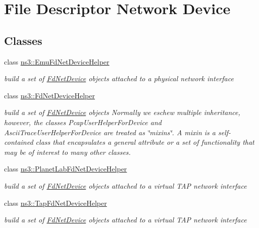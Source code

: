 \hypertarget{group__fd-net-device}{}\section{File Descriptor Network Device}
\label{group__fd-net-device}
\subsection*{Classes}
\begin{DoxyCompactItemize}
\item 
class \hyperlink{classns3_1_1EmuFdNetDeviceHelper}{ns3\+::\+Emu\+Fd\+Net\+Device\+Helper}
\begin{DoxyCompactList}\small\item\em build a set of \hyperlink{classns3_1_1FdNetDevice}{Fd\+Net\+Device} objects attached to a physical network interface \end{DoxyCompactList}\item 
class \hyperlink{classns3_1_1FdNetDeviceHelper}{ns3\+::\+Fd\+Net\+Device\+Helper}
\begin{DoxyCompactList}\small\item\em build a set of \hyperlink{classns3_1_1FdNetDevice}{Fd\+Net\+Device} objects Normally we eschew multiple inheritance, however, the classes Pcap\+User\+Helper\+For\+Device and Ascii\+Trace\+User\+Helper\+For\+Device are treated as \char`\"{}mixins\char`\"{}. A mixin is a self-\/contained class that encapsulates a general attribute or a set of functionality that may be of interest to many other classes. \end{DoxyCompactList}\item 
class \hyperlink{classns3_1_1PlanetLabFdNetDeviceHelper}{ns3\+::\+Planet\+Lab\+Fd\+Net\+Device\+Helper}
\begin{DoxyCompactList}\small\item\em build a set of \hyperlink{classns3_1_1FdNetDevice}{Fd\+Net\+Device} objects attached to a virtual T\+AP network interface \end{DoxyCompactList}\item 
class \hyperlink{classns3_1_1TapFdNetDeviceHelper}{ns3\+::\+Tap\+Fd\+Net\+Device\+Helper}
\begin{DoxyCompactList}\small\item\em build a set of \hyperlink{classns3_1_1FdNetDevice}{Fd\+Net\+Device} objects attached to a virtual T\+AP network interface \end{DoxyCompactList}\item 

\end{DoxyCompactItemize}
